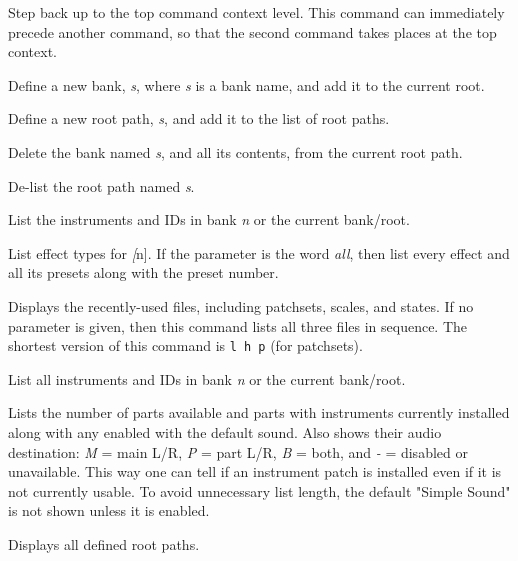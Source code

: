       Step back up to the top command context level.
      This command can immediately precede another command, so that the second
      command takes places at the top context.

      Define a new bank, \textsl{s}, where \textsl{s} is a bank name,
      and add it to the current root.

      Define a new root path, \textsl{s}, and add it to the list of root paths.

      Delete the bank named \textsl{s}, and all its contents,
      from the current root path.

      De-list the root path named \textsl{s}.

      List the instruments and IDs in bank \textsl{n} or the
      current bank/root.

      List effect types for \textsl[n].
      If the parameter is the word \textsl{all},
      then list every effect and all its
      presets along with the preset number.

      Displays the recently-used files, including patchsets, scales, and
      states.  If no parameter is given, then this command lists all three
      files in sequence.  The shortest version of this command is
      \texttt{l h p} (for patchsets).

      List all instruments and IDs in bank \textsl{n}
      or the current bank/root.

      Lists the number of parts available and parts with instruments
      currently installed along with any enabled with the default sound.
      Also shows their audio destination:
      \textsl{M} = main L/R, \textsl{P} = part L/R, \textsl{B} = both, and
      \textsl{-} = disabled or unavailable.
      This way one can tell if an instrument patch is installed even if it is
      not currently usable.
      To avoid unnecessary list length, the default "Simple Sound" is not shown
      unless it is enabled.

      Displays all defined root paths.


